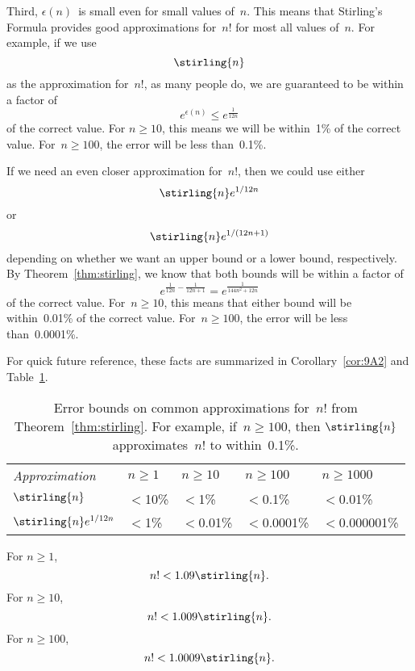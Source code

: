 Third, $\epsilon(n)$~is small even for small values of~$n$.  This
means that Stirling's Formula provides good approximations for~$n!$
for most all values of~$n$.  For example, if we use
\[
    \stirling{n}
\]
as the approximation for~$n!$, as many people do, we are guaranteed
to be within a factor of
\[
    e^{\epsilon(n)} \le e^{\frac{1}{12n}}
\]
of the correct value.  For $n \ge 10$, this means we will be
within~1\% of the correct value.  For~$n \ge 100$, the error will be
less than~0.1\%.

If we need an even closer approximation for~$n!$, then we could use
either
\[
    \stirling{n} e^{1/12n}
\]
or
\[
    \stirling{n} e^{1/(12n + 1)}
\]
depending on whether we want an upper bound or a lower bound,
respectively.  By Theorem~\ref{thm:stirling}, we know that both bounds
will be within a factor of
\[
    e^{ \frac{1}{12n} - \frac{1}{12n + 1} } = e^{\frac{1}{144n^2 + 12n }}
\]
of the correct value.  For~$n \ge 10$, this means that either bound
will be within~0.01\% of the correct value.  For~$n \ge 100$, the
error will be less than~0.0001\%.

For quick future reference, these facts are summarized in
Corollary~\ref{cor:9A2} and Table~\ref{fig:9A1}.

\begin{table}\redrawntrue

\renewcommand{\arraystretch}{1.5}

\begin{tabular}{l|llll}

\multicolumn{1}{l}{\emph{Approximation}}
    & $n \ge 1$
    & $n \ge 10$
    & $n \ge 100$
    & $n \ge 1000$ \\
\cline{2-5}
$\stirling{n}$
    & ${}<{}$10\%
    & ${}<{}$1\%
    & ${}<{}$0.1\%
    & ${}<{}$0.01\%\\

$\stirling{n} e^{1/12n}$
    & ${}<{}$1\%
    & ${}<{}$0.01\%
    & ${}<{}$0.0001\%
    & ${}<{}$0.000001\%
\end{tabular}

\caption{Error bounds on common approximations for~$n!$ from
  Theorem~\ref{thm:stirling}.  For example, if~$n \ge 100$, then
  $\protect\stirling{n}$ approximates~$n!$ to within~0.1\%.}

\label{fig:9A1}

\end{table}

\begin{corollary}\label{cor:9A2}
For $n \ge 1$,
\[
    n! < 1.09 \stirling{n}.
\]
For $n \ge 10$,
\[
    n! < 1.009 \stirling{n}.
\]
For $n \ge 100$,
\[
    n! < 1.0009 \stirling{n}.
\]

\end{corollary}

